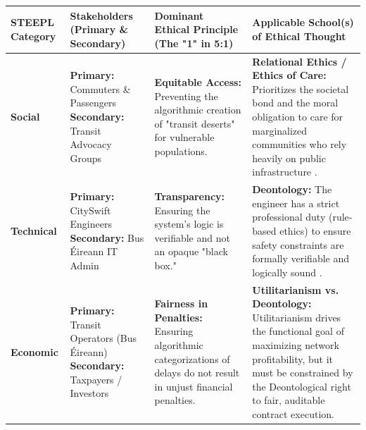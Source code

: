 \documentclass[]
{UCD_CS_41820_Report}
\begin{document}
\begin{table}[H]
  \centering
  \renewcommand{\arraystretch}{1.5}
  \begin{tabular}{|p{1.7cm}|p{3.7cm}|p{3.5cm}|p{4.5cm}|}
    \hline
    \textbf{STEEPL Category}                                                                                                      &
    \textbf{Stakeholders (Primary \& Secondary)}                                                                                  &
    \textbf{Dominant Ethical Principle (The "1" in 5:1)}                                                                          &
    \textbf{Applicable School(s) of Ethical Thought}                                                                                                                                                                    \\
    \hline

    \textbf{Social}                                                                                                               &
    \textbf{Primary:} Commuters \& Passengers \newline
    \textbf{Secondary:} Transit Advocacy Groups                                                                                   &
    \textbf{Equitable Access:} Preventing the algorithmic creation of "transit deserts" for vulnerable populations.               &
    \textbf{Relational Ethics / Ethics of Care:} Prioritizes the societal bond and the moral obligation to care for marginalized communities who rely heavily on public infrastructure \cite{relational_ethics}.        \\
    \hline

    \textbf{Technical}                                                                                                            &
    \textbf{Primary:} CitySwift Engineers \newline
    \textbf{Secondary:} Bus Éireann IT Admin                                                                                      &
    \textbf{Transparency:} Ensuring the system's logic is verifiable and not an opaque "black box."                               &
    \textbf{Deontology:} The engineer has a strict professional duty (rule-based ethics) to ensure safety constraints are formally verifiable and logically sound \cite{intro_machine_ethics}.                          \\
    \hline

    \textbf{Economic}                                                                                                             &
    \textbf{Primary:} Transit Operators (Bus Éireann) \newline
    \textbf{Secondary:} Taxpayers / Investors                                                                                     &
    \textbf{Fairness in Penalties:} Ensuring algorithmic categorizations of delays do not result in unjust financial penalties.   &
    \textbf{Utilitarianism vs. Deontology:} Utilitarianism drives the functional goal of maximizing network profitability, but it must be constrained by the Deontological right to fair, auditable contract execution. \\
    \hline


\end{tabular}
\end{table}
\end{document}
